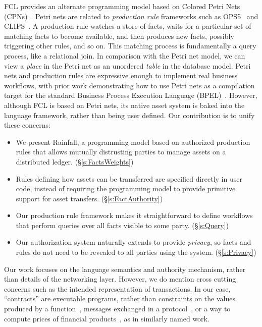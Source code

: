 FCL provides an alternate programming model based on Colored Petri Nets (CPNs)~\cite{Jensen1981:ColouredPetri}. Petri nets are related to \emph{production rule} frameworks such as OPS5~\cite{Forgy1981:OPS5} and CLIPS~\cite{Riley2017:CLIPS}. A production rule watches a store of facts, waits for a particular set of matching facts to become available, and then produces new facts, possibly triggering other rules, and so on. This matching process is fundamentally a query process, like a relational join. In comparison with the Petri net model, we can view a \emph{place} in the Petri net as an unordered \emph{table} in the database model. Petri nets and production rules are expressive enough to implement real business workflows, with prior work demonstrating how to use Petri nets as a compilation target for the standard Business Process Execution Language (BPEL)~\cite{Lohmann2009:PetriBPEL}.  However, although FCL is based on Petri nets, its native asset system is baked into the language framework, rather than being user defined. Our contribution is to unify these concerns:

\begin{itemize}
\item We present Rainfall, a programming model based on authorized production rules that allows mutually distrusting parties to manage assets on a distributed ledger. (\S\ref{s:FactsWeights})

\item Rules defining how assets can be transferred are specified directly in user code, instead of requiring the programming model to provide primitive support for asset transfers. (\S\ref{s:FactAuthority})

\item Our production rule framework makes it straightforward to define workflows that perform queries over all facts visible to some party. (\S\ref{s:Query})

\item Our authorization system naturally extends to provide \emph{privacy}, so facts and rules do not need to be revealed to all parties using the system. (\S\ref{s:Privacy})
\end{itemize}

Our work focuses on the language semantics and authority mechanism, rather than details of the networking layer. However, we do mention cross cutting concerns such as the intended representation of transactions. In our case, ``contracts'' are executable programs, rather than constraints on the values produced by a function~\cite{Findler2002:Contracts}, messages exchanged in a protocol~\cite{Das2019:Resource, Deon2019:CSL}, or a way to compute prices of financial products~\cite{PeytonJones2000:Composing}, as in similarly named work.




